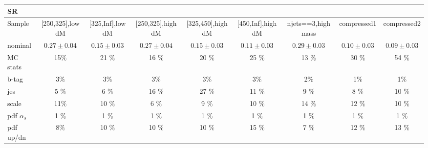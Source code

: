\begin{table}
\begin{center}
\small
\begin{tabular}{lcccccccc}
\hline
SR & & & & & & & &\\
\hline
Sample&[250,325],low dM&[325,Inf],low dM&[250,325],high dM&[325,450],high dM&[450,Inf],high dM&njets==3,high mass&compressed1&compressed2\\
\hline
nominal&$0.27\pm0.04$&$0.15\pm0.03$&$0.27\pm0.04$&$0.15\pm0.03$&$0.11\pm0.03$&$0.29\pm0.03$&$0.10\pm0.03$&$0.09\pm0.03$\\
\hline
\hline
MC stats & 15$\%$ & 21 $\%$ &16 $\%$ &20 $\%$ &25 $\%$ &13 $\%$ &30 $\%$ &54 $\%$\\
b-tag & 3$\%$ & 3$\%$ & 3$\%$ & 3$\%$ & 3$\%$ & 2$\%$ & 1$\%$ & 1$\%$\\
jes & 5 $\%$ & 6 $\%$ & 16 $\%$& 27 $\%$ & 11 $\%$ &9 $\%$& 8 $\%$ &10 $\%$\\
scale & 11$\%$& 10 $\%$ &6 $\%$& 9 $\%$ &10 $\%$& 14 $\%$ &12 $\%$ &10 $\%$\\
pdf $\alpha_s$ & 1 $\%$& 1 $\%$ &1 $\%$ &1 $\%$ &1 $\%$& 1 $\%$ &1 $\%$& 1 $\%$\\
pdf up/dn & 8$\%$ &10 $\%$ &10 $\%$ &10 $\%$ &15 $\%$ &7 $\%$ &12 $\%$ &13 $\%$\\
\hline\hline
\end{tabular}
\end{center}
\end{table}
